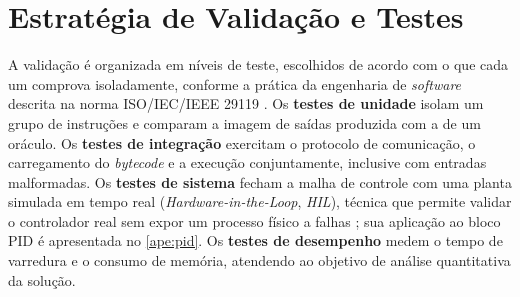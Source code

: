 \begin{figurafixa}
    \centering
    \label{fig:protocolo-sequencia}

\end{figurafixa}


\section{Estratégia de Validação e Testes}
\label{sec:validacao-testes}

A validação é organizada em níveis de teste, escolhidos de acordo com o que cada um comprova isoladamente, conforme a prática da engenharia de \textit{software} descrita na norma ISO/IEC/IEEE 29119 \cite{iso:29119-1}.
Os \textbf{testes de unidade} isolam um grupo de instruções e comparam a imagem de saídas produzida com a de um oráculo.
Os \textbf{testes de integração} exercitam o protocolo de comunicação, o carregamento do \textit{bytecode} e a execução conjuntamente, inclusive com entradas malformadas.
Os \textbf{testes de sistema} fecham a malha de controle com uma planta simulada em tempo real (\textit{Hardware-in-the-Loop}, \textit{HIL}), técnica que permite validar o controlador real sem expor um processo físico a falhas \cite{isermann:1999}; sua aplicação ao bloco PID é apresentada no \ref{ape:pid}.
Os \textbf{testes de desempenho} medem o tempo de varredura e o consumo de memória, atendendo ao objetivo de análise quantitativa da solução.

